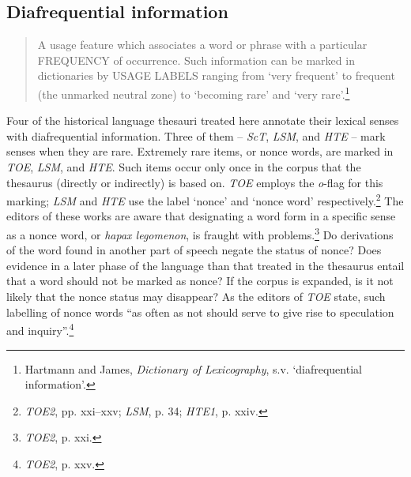 \subsection*{Diafrequential information}
\begin{quotation} \noindent
A usage feature which associates a word or phrase with a particular FREQUENCY of occurrence. Such information can be marked in dictionaries by USAGE LABELS ranging from `very frequent' to frequent (the unmarked neutral zone) to `becoming rare' and `very rare'.\footnote{Hartmann and James, \textit{Dictionary of Lexicography}, s.v. `diafrequential information'.}
\end{quotation}
Four of the historical language thesauri treated here annotate their lexical senses with diafrequential information. Three of them -- \textit{ScT}, \textit{LSM}, and \textit{HTE} -- mark senses when they are rare. Extremely rare items, or nonce words, are marked in \textit{TOE}, \textit{LSM}, and \textit{HTE}. Such items occur only once in the corpus that the thesaurus (directly or indirectly) is based on. \textit{TOE} employs the \textit{o}-flag for this marking; \textit{LSM} and \textit{HTE} use the label `nonce' and `nonce word' respectively.\footnote{\textit{TOE2}, pp. xxi–xxv; \textit{LSM}, p. 34; \textit{HTE1}, p. xxiv.} The editors of these works are aware that designating a word form in a specific sense as a nonce word, or \textit{hapax legomenon}, is fraught with problems.\footnote{\textit{TOE2}, p. xxi.} Do derivations of the word found in another part of speech negate the status of nonce? Does evidence in a later phase of the language than that treated in the thesaurus entail that a word should not be marked as nonce? If the corpus is expanded, is it not likely that the nonce status may disappear? As the editors of \textit{TOE} state, such labelling of nonce words ``as often as not should serve to give rise to speculation and inquiry''.\footnote{\textit{TOE2}, p. xxv.}

